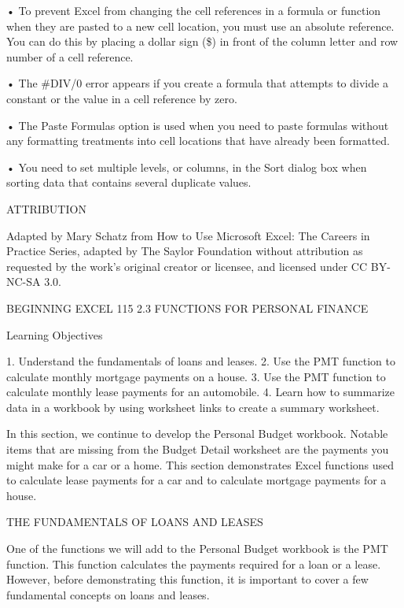• To prevent Excel from changing the cell references in a formula or function when they are pasted to a new
cell location, you must use an absolute reference. You can do this by placing a dollar sign (\$) in front of the
column letter and row number of a cell reference.

• The \#DIV/0 error appears if you create a formula that attempts to divide a constant or the value in a cell
reference by zero.

• The Paste Formulas option is used when you need to paste formulas without any formatting treatments into
cell locations that have already been formatted.

• You need to set multiple levels, or columns, in the Sort dialog box when sorting data that contains several
duplicate values.



ATTRIBUTION

Adapted by Mary Schatz from How to Use Microsoft Excel: The Careers in Practice Series, adapted
by The Saylor Foundation without attribution as requested by the work’s original creator or
licensee, and licensed under CC BY-NC-SA 3.0.




BEGINNING EXCEL 115
2.3 FUNCTIONS FOR PERSONAL FINANCE




Learning Objectives


1. Understand the fundamentals of loans and leases.
2. Use the PMT function to calculate monthly mortgage payments on a house.
3. Use the PMT function to calculate monthly lease payments for an automobile.
4. Learn how to summarize data in a workbook by using worksheet links to create a summary worksheet.



In this section, we continue to develop the Personal Budget workbook. Notable items that are
missing from the Budget Detail worksheet are the payments you might make for a car or a home.
This section demonstrates Excel functions used to calculate lease payments for a car and to calculate
mortgage payments for a house.

THE FUNDAMENTALS OF LOANS AND LEASES

One of the functions we will add to the Personal Budget workbook is the PMT function. This function
calculates the payments required for a loan or a lease. However, before demonstrating this function,
it is important to cover a few fundamental concepts on loans and leases.

